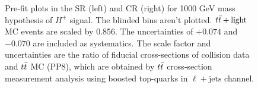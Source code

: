 \begin{figure}[H]
  \centering
  \caption{Pre-fit plots in the SR (left) and CR (right) for 1000 GeV mass hypothesis of $H^{+}$ signal. The blinded bins aren't plotted. $t\Bar{t}+\text{light}$ MC events are scaled by 0.856. The uncertainties of $+0.074$ and $-0.070$ are included as systematics. The scale factor and uncertainties are the ratio of fiducial cross-sections of collision data and $t\Bar{t}$ MC (PP8), which are obtained by $t\Bar{t}$ cross-section measurement analysis using boosted top-quarks in $\ell+\text{jets}$ channel.}
  \label{fig:Prefit_Hp1000_Blind_with_ttlight_constrained}
\end{figure}
